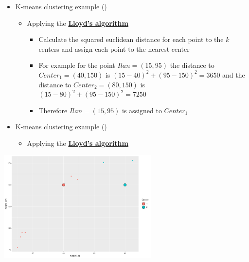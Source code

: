 \documentclass[
  ignorenonframetext,
]{beamer}
\providecommand{\tightlist}{%
  \setlength{\itemsep}{0pt}\setlength{\parskip}{0pt}}\usepackage{longtable,booktabs,array}
\begin{document}
\begin{frame}{}
\label{section-37}
\begin{itemize}
\item
  K-means clustering example
  ()

  \begin{itemize}
  \item
    Applying the
    \href{https://en.wikipedia.org/wiki/K-means_clustering}{\textbf{Lloyd's
    algorithm}}

    \begin{itemize}
    \item
      Calculate the squared euclidean distance for each point to the
      \(k\) centers and assign each point to the nearest center
    \item
      For example for the point \(Ilan = (15, 95)\) the distance to
      \(Center_1 = (40, 150)\) is \((15 - 40)^2 + (95 - 150)^2 = 3650\)
      and the distance to \(Center_2 = (80, 150)\) is
      \((15 - 80)^2 + (95 - 150)^2 = 7250\)
    \item
      Therefore \(Ilan = (15, 95)\) is assigned to \(Center_1\)
    \end{itemize}
  \end{itemize}
\end{itemize}
\end{frame}

\begin{frame}{}
\label{section-38}
\begin{itemize}
\item
  K-means clustering example
  ()

  \begin{itemize}
  \tightlist
  \item
    Applying the
    \href{https://en.wikipedia.org/wiki/K-means_clustering}{\textbf{Lloyd's
    algorithm}}
  \end{itemize}
\end{itemize}

\begin{center}
\includegraphics[width=0.6\textwidth,height=\textheight]{011_segmentation_clustering_files/figure-beamer/unnamed-chunk-27-1.pdf}
\end{center}
\end{frame}
\end{document}
